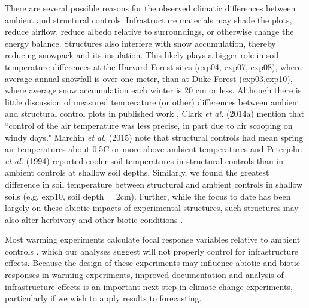 \documentclass{article}
\begin{document}
\par There are several possible reasons for the observed climatic differences between ambient and structural controls. Infrastructure materials may shade the plots, reduce airflow, reduce albedo relative to surroundings, or otherwise change the energy balance. Structures also interfere with snow accumulation, thereby reducing snowpack and its insulation. %
This likely plays a bigger role in soil temperature differences at the Harvard Forest sites (exp04, exp07, exp08), where average annual snowfall is over one meter, than at Duke Forest (exp03,exp10), where average snow accumulation each winter is 20 cm or less. Although there is little discussion of measured temperature (or other) differences between ambient and structural control plots in published work \citep[e.g.,][]{farnsworth1995,pelini2011,clark2014a,clark2014b}, Clark \textit{et al.} (2014a) mention that ``control of the air temperature was less precise, in part due to air scooping on windy days." Marchin \textit{et al.} (2015) note that structural controls had mean spring air temperatures about  0.5\degree C or more above ambient temperatures and Peterjohn \textit{et al.} (1994) reported cooler soil temperatures in structural controls than in ambient controls at shallow soil depths. Similarly, we found the greatest difference in soil temperature between structural and ambient controls in shallow soils (e.g. exp10, soil depth = 2cm). Further, while the focus to date has been largely on these abiotic impacts of experimental structures, such structures may also alter herbivory and other biotic conditions \citep{kennedy1995,moise2010,wolkovich2012,hoeppner2012}. 

\par Most warming experiments calculate focal response variables relative to ambient controls \citep [e.g.,][]{marchin2015}, which our analyses suggest will not properly control for infrastructure effects. Because the design of these experiments may influence abiotic and biotic responses in warming experiments, improved documentation and analysis of infrastructure effects is an important next step in climate change experiments, particularly if we wish to apply results to forecasting.
\end{document}
